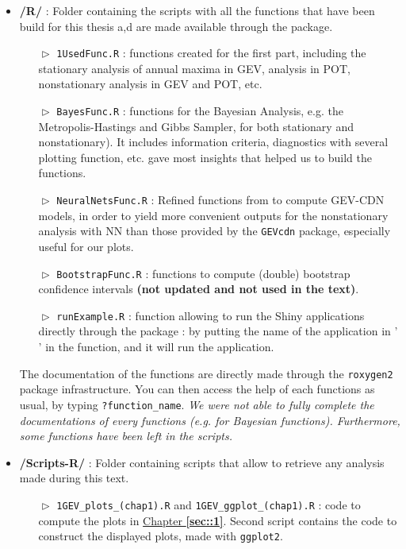 \begin{itemize}
\item \textbf{/R/} : Folder containing the scripts with all the functions that have been build for this thesis a,d are made available through the package. 

  \begin{itemize}
\item[$\vartriangleright$] \texttt{1UsedFunc.R} : functions created for the first part, including  the stationary analysis of annual maxima in GEV, analysis in POT, nonstationary analysis in GEV and POT, etc.
\item[$\vartriangleright$] \texttt{BayesFunc.R} : functions for the Bayesian Analysis, e.g. the Metropolis-Hastings and Gibbs Sampler, for both stationary and nonstationary). It includes information criteria, diagnostics with several plotting function, etc. \citet[chap.13]{dey_extreme_2016} gave most insights that helped us to build the functions.

\item[$\vartriangleright$] \texttt{NeuralNetsFunc.R} : Refined functions from \citet{cannon_flexible_2010} to compute GEV-CDN models, in order to yield more convenient outputs for the nonstationary analysis with NN than those provided by the \texttt{GEVcdn} package, especially useful for our plots. 
\item[$\vartriangleright$] \texttt{BootstrapFunc.R} : functions to compute (double) bootstrap confidence intervals \textbf{(not updated and not used in the text)}.
\item[$\vartriangleright$] \texttt{runExample.R} : function allowing to run the Shiny applications directly through the package : by putting the name of the application in ' ' in the function, and it will run the application. 
  \end{itemize} 

The documentation of the functions are directly made through the \texttt{roxygen2} package infrastructure. You can then access the help of each functions as usual, by typing \texttt{?function\_name}. 
\emph{We were not able to fully complete the documentations of every functions (e.g. for Bayesian functions). Furthermore, some functions have been left in the scripts.}
\item \textbf{/Scripts-R/} : Folder containing scripts that allow to retrieve any analysis made during this text.

  \begin{itemize}
\item[$\vartriangleright$] \texttt{1GEV\_plots\_(chap1).R} and \texttt{1GEV\_ggplot\_(chap1).R} : code to compute the plots in \hyperref[sec::1]{Chapter \textbf{\ref{sec::1}}}. Second script contains the code to construct the displayed plots, made with \texttt{ggplot2}.


\end{itemize}
\end{itemize}
